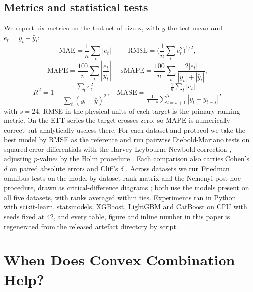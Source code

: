 \documentclass[journal]{IEEEtran}
\begin{document}
\subsection{Metrics and statistical tests}
We report six metrics on the test set of size $n$, with $\bar{y}$ the test mean and $e_t = y_t - \hat{y}_t$:
\begin{equation}
\mathrm{MAE} = \frac{1}{n}\sum_{t} |e_t|, \qquad
\mathrm{RMSE} = \Bigg(\frac{1}{n}\sum_{t} e_t^2\Bigg)^{\!1/2},
\label{eq:maermse}
\end{equation}
\begin{equation}
\mathrm{MAPE} = \frac{100}{n}\sum_{t} \left|\frac{e_t}{y_t}\right|, \quad
\mathrm{sMAPE} = \frac{100}{n}\sum_{t} \frac{2|e_t|}{|y_t| + |\hat{y}_t|},
\label{eq:mape}
\end{equation}
\begin{equation}
R^2 = 1 - \frac{\sum_t e_t^2}{\sum_t (y_t - \bar{y})^2}, \quad
\mathrm{MASE} = \frac{\frac{1}{n}\sum_t |e_t|}{\frac{1}{T-s}\sum_{t=s+1}^{T} |y_t - y_{t-s}|},
\label{eq:r2mase}
\end{equation}
with $s = 24$. RMSE in the physical units of each target is the primary ranking metric. On the ETT series the target crosses zero, so MAPE is numerically correct but analytically useless there. For each dataset and protocol we take the best model by RMSE as the reference and run pairwise Diebold-Mariano tests \cite{r22} on squared-error differentials with the Harvey-Leybourne-Newbold correction \cite{r23}, adjusting $p$-values by the Holm procedure \cite{r26}. Each comparison also carries Cohen's $d$ on paired absolute errors and Cliff's $\delta$ \cite{r25}. Across datasets we run Friedman omnibus tests on the model-by-dataset rank matrix and the Nemenyi post-hoc procedure, drawn as critical-difference diagrams \cite{r24}; both use the \nCommonOne{} models present on all five datasets, with ranks averaged within ties. Experiments ran in Python with scikit-learn, statsmodels, XGBoost, LightGBM and CatBoost on CPU with seeds fixed at 42, and every table, figure and inline number in this paper is regenerated from the released artefact directory by script.

\section{When Does Convex Combination Help?}
\label{sec:theory}
\end{document}
